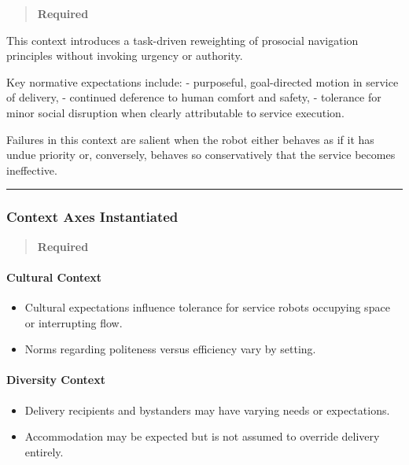 \documentclass[utf8]{frontiers_suppmat} %
\providecommand{\tightlist}{%
  \setlength{\itemsep}{0pt}\setlength{\parskip}{0pt}}
\begin{document}
\begin{quote}
\textbf{Required}
\end{quote}

This context introduces a task-driven reweighting of prosocial
navigation principles without invoking urgency or authority.

Key normative expectations include: - purposeful, goal-directed motion
in service of delivery, - continued deference to human comfort and
safety, - tolerance for minor social disruption when clearly
attributable to service execution.

Failures in this context are salient when the robot either behaves as if
it has undue priority or, conversely, behaves so conservatively that the
service becomes ineffective.

\begin{center}\rule{0.5\linewidth}{0.5pt}\end{center}

\subsubsection{Context Axes
Instantiated}\label{context-axes-instantiated}

\begin{quote}
\textbf{Required}
\end{quote}

\paragraph{Cultural Context}\label{cultural-context}

\begin{itemize}
\tightlist
\item
  Cultural expectations influence tolerance for service robots occupying
  space or interrupting flow.
\item
  Norms regarding politeness versus efficiency vary by setting.
\end{itemize}

\paragraph{Diversity Context}\label{diversity-context}

\begin{itemize}
\tightlist
\item
  Delivery recipients and bystanders may have varying needs or
  expectations.
\item
  Accommodation may be expected but is not assumed to override delivery
  entirely.
\end{itemize}
\end{document}
